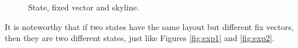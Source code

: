 \documentclass[review,3p,times,12pt,number]{elsarticle}\usepackage{amsmath}\usepackage{amssymb}
\begin{document}
\begin{figure}[htbp]
\centering
{}
\caption{State, fixed vector and skyline.}
\label{fig:skyline}
\end{figure}


It is noteworthy that if two states have the same layout but different fix vectors, then they are two different states, just like Figures \ref{fig:exp1} and \ref{fig:exp2}.
\end{document}
